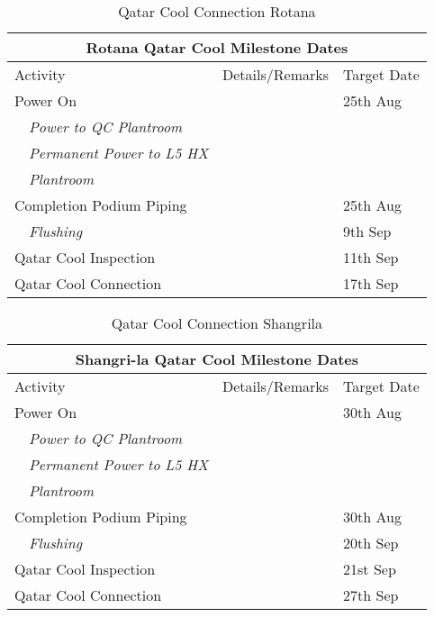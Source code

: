 \begin{table}[htbp]
\small
\begin{tabular}{p{4.3cm}p{3.5cm}l }
\toprule
\multicolumn{3}{c}{{Rotana Qatar Cool  Milestone Dates}}\\
\midrule
Activity	                                       &Details/Remarks	&Target Date                \\
\midrule
Power On		                           &      			& 25th Aug      \\
~~\em{Power to QC Plantroom}	   &                              &                           \\	
~~\em{Permanent Power to L5 HX}     &                               &                           \\
~~\em{Plantroom}		               &                              &                           \\
Completion Podium Piping	               &		           & 25th Aug     \\
~~\em{Flushing}                                   &                              & 9th Sep         \\
Qatar Cool Inspection 	               &      		           &11th Sep\\
Qatar Cool Connection	               &		           &17th Sep\\
 \bottomrule
\end{tabular}
\caption{Qatar Cool Connection Rotana}
\end{table} 


\begin{table}[htbp]
\small
\begin{tabular}{p{4.3cm}p{3.5cm}l }
\toprule
\multicolumn{3}{c}{{Shangri-la Qatar Cool  Milestone Dates}}\\
\midrule
Activity	                                       &Details/Remarks	&Target Date                \\
\midrule
Power On		                           &      			& 30th Aug      \\
~~\em{Power to QC Plantroom}	   &                              &                           \\	
~~\em{Permanent Power to L5 HX}     &                               &                           \\
~~\em{Plantroom}		               &                              &                           \\
Completion Podium Piping	               &		           & 30th Aug     \\
~~\em{Flushing}                                   &                              & 20th Sep       \\
Qatar Cool Inspection 	               &      		           &21st Sep\\
Qatar Cool Connection	               &		           &27th Sep\\
 \bottomrule
\end{tabular}
\caption{Qatar Cool Connection Shangrila}
\end{table} 

